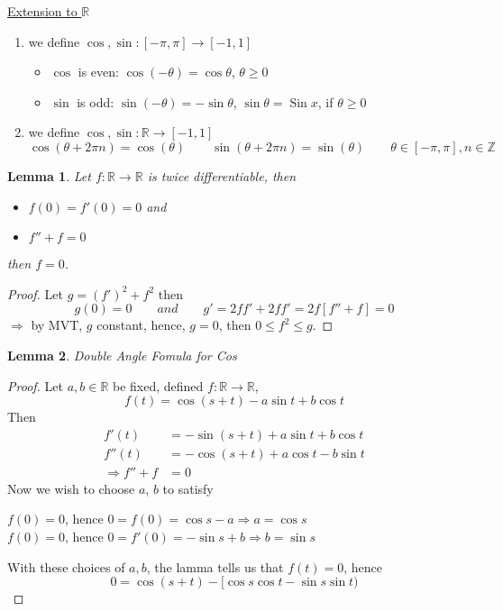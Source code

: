 \documentclass[12pt]{article}
\theoremstyle{plain}
\newtheorem{lemma}{Lemma}[subsection]
\newcommand{\mR}{{\mathbb{R}}}
\newcommand{\mZ}{{\mathbb{Z}}}
\DeclareMathOperator{\Sin}{Sin}
\begin{document}
	\underline{Extension to $\mR$} 
	\begin{enumerate}[label=(\alph*)]
		\item we define $\cos, \sin:[-\pi,\pi] \to [-1,1]$
			\begin{itemize}
				\item $\cos$ is even: $\cos (-\theta) = \cos \theta$,
				$\theta \geq 0$
				\item $\sin$ is odd: $\sin(-\theta) = -\sin \theta$, 
					$\sin \theta = \Sin x$, if $\theta \geq 0$ 
			\end{itemize}
		\item we define $\cos, \sin : \mR \to [-1, 1]$
			\[
				\cos(\theta + 2\pi n) = \cos(\theta)
				\qquad 
				\sin (\theta + 2\pi n) = \sin(\theta)
				\qquad 
				\theta \in [-\pi, \pi], n \in \mZ
			\]
	\end{enumerate}

	\begin{lemma}
		Let $f: \mR \to \mR$ is twice differentiable, then 
		\begin{itemize}
			\item $f(0) = f'(0) = 0$ and 
			\item $f''+f=0$
		\end{itemize}
		then $f=0$. 
	\end{lemma}
	\begin{proof}
		Let $g=(f')^2 + f^2$ then
		\[
			g(0)=0 \qquad and \qquad 
			g'= 2ff'+ 2ff'=2f[f''+f] = 0
		\]
		$\Rightarrow$ by MVT, $g$ constant, hence, $g=0$, 
		then $0\leq f^2 \leq g$. 
	\end{proof}

	\begin{lemma}
		Double Angle Fomula for Cos
	\end{lemma}
	\begin{proof}
		Let $a, b \in \mR$ be fixed, defined $f : \mR \to \mR$, 
		\[
			f(t) = \cos(s+t) - a \sin t + b\cos t
		\]
		Then
		\begin{align*}
			f'(t) & = - \sin (s+t) + a\sin t + b \cos t\\
			f''(t) &= -\cos (s+t) + a\cos t -b\sin t\\
			\Rightarrow f''+f &= 0
		\end{align*}
		Now we wish to choose $a$, $b$ to satisfy
		
		$f(0)=0$, hence $0=f(0)=\cos s - a \Rightarrow a = \cos s$\\
		$f(0)=0$, hence $0=f'(0)=-\sin s + b \Rightarrow b = \sin s$

		With these choices of $a,b$, the lamma tells us that $f(t) = 0$, hence
		\[
			0 = \cos(s+t) - [\cos s \cos t-\sin s \sin t)
		\]
	\end{proof}
\end{document}
